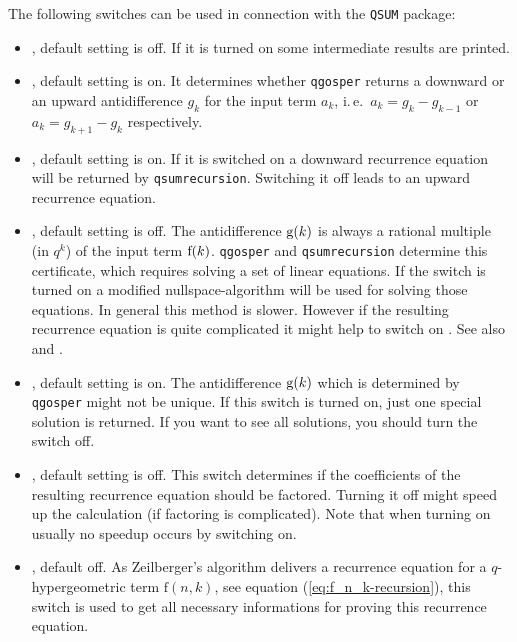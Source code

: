 The following switches can be used in connection with
the \texttt{QSUM} package:
%
\begin{itemize}
	\item {}, default setting is off. If it is
		turned on some intermediate results are printed.
	\item {}, default setting is on. It determines
		whether \texttt{qgosper} returns a downward or an upward
		antidifference $g_k$ for the input term $a_k$,
	   i.\,e.\ $a_k=g_k-g_{k-1}$ or $a_k=g_{k+1}-g_k$ respectively.
	\item {}, default setting is on. If it is
		switched on a downward recurrence equation will be returned by
		\texttt{qsumrecursion}. Switching it off leads to an upward
		recurrence equation.
	\item {}, default setting is off. The
		antidifference ${\mathrm g}(k)$ is always a rational multiple (in $q^k$)
		of the input term ${\mathrm f}(k)$. \texttt{qgosper} and \texttt{qsumrecursion}
		determine this certificate, which requires solving a set of
		linear equations. If the switch  is
		turned on a modified nullspace-algorithm will be used for
		solving those equations. In general this method is slower.
		However if the resulting recurrence equation is quite complicated
		it might help to switch on .
		See also \cite{Knuth:TAoCP2} and \cite{PauleRiese:95}.
	\item {}, default setting is on. The
		antidifference ${\mathrm g}(k)$ which is determined by
		\texttt{qgosper} might not be unique. If this switch is turned on,
		just one special solution is returned. If you want
		to see all solutions, you should turn the switch off.
	\item {}, default setting is off. This
		switch determines if the coefficients of the
		resulting recurrence equation should
		be factored. Turning it off might speed up the calculation
		(if factoring is complicated). Note that
		when turning on  usually no speedup
		occurs by switching  on.
	\item {}, default off.
		As Zeilberger's algorithm
		delivers a recurrence equation for a $q$-hypergeometric term
		$\mathrm{f}(n,k)$, see equation (\ref{eq:f_n_k-recursion}),
		this switch is used to get all necessary informations for
		proving this recurrence equation.


\end{itemize}
